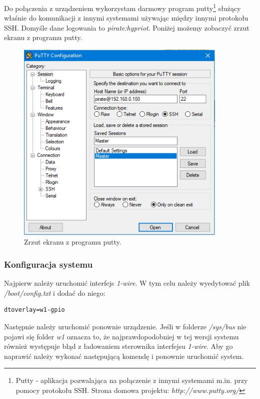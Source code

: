 \documentclass[12pt]{report}
\let\Oldsubsubsection\subsubsection
\renewcommand{\subsubsection}{\FloatBarrier\Oldsubsubsection}
\begin{document}
{Do połączenia z urządzeniem wykorzystam darmowy program putty\footnote{Putty - aplikacja pozwalająca na połączenie z innymi systemami m.in. przy pomocy protokołu SSH. Strona domowa projektu: \textit{http://www.putty.org/}} służący właśnie do komunikacji z innymi systemami używając między innymi protokołu SSH. Domyśle dane logowania to \textit{pirate:hypriot}. Poniżej możemy zobaczyć zrzut ekranu z programu putty.

\begin{figure}[h]
	\centering
	\includegraphics[width=0.9\textwidth]{images/putty.png}
	\caption{Zrzut ekranu z programu putty.}
\end{figure}
\FloatBarrier

\subsubsection{Konfiguracja systemu}
Najpierw należy uruchomić interfejs \textit{1-wire}. W tym celu należy wyedytować plik \textit{/boot/config.txt} i dodać do niego:

\begin{lstlisting}
dtoverlay=w1-gpio
\end{lstlisting}

Następnie należy uruchomić ponownie urządzenie. Jeśli w folderze \textit{/sys/bus} nie pojawi się folder \textit{w1} oznacza to, że najprawdopodobniej w tej wersji systemu również występuje błąd z ładowaniem sterownika interfejsu \textit{1-wire}. Aby go naprawić należy wykonać następującą komendę i ponownie uruchomić system.

}
\end{document}
